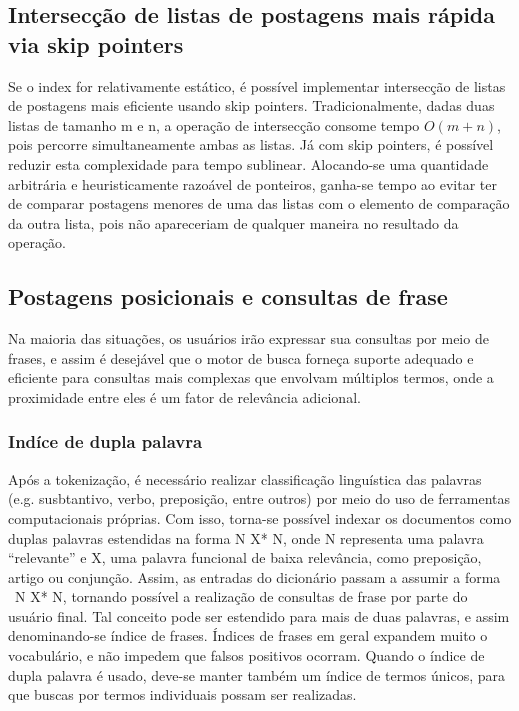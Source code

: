 \subsection{Intersecção de listas de postagens mais rápida via skip pointers}

Se o index for relativamente estático, é possível implementar intersecção de listas de postagens mais eficiente usando skip pointers. Tradicionalmente, dadas duas listas de tamanho m e n, a operação de intersecção consome tempo $O(m+n)$, pois percorre simultaneamente ambas as listas. Já com skip pointers, é possível reduzir esta complexidade para tempo sublinear. Alocando-se uma quantidade arbitrária e heuristicamente razoável de ponteiros, ganha-se tempo ao evitar ter de comparar postagens menores de uma das listas com o elemento de comparação da outra lista, pois não apareceriam de qualquer maneira no resultado da operação.

\subsection{Postagens posicionais e consultas de frase}

Na maioria das situações, os usuários irão expressar sua consultas por meio de frases, e assim é desejável que o motor de busca forneça suporte adequado e eficiente para consultas mais complexas que envolvam múltiplos termos, onde a proximidade entre eles é um fator de relevância adicional.

\subsubsection{Indíce de dupla palavra}

Após a tokenização, é necessário realizar classificação linguística das palavras (e.g. susbtantivo, verbo, preposição, entre outros) por meio do uso de ferramentas computacionais próprias. Com isso, torna-se possível indexar os documentos como duplas palavras estendidas na forma N X* N, onde N representa uma palavra “relevante” e X, uma palavra funcional de baixa relevância, como preposição, artigo ou conjunção. Assim, as entradas do dicionário passam a assumir a forma  N X* N, tornando possível a realização de consultas de frase por parte do usuário final. Tal conceito pode ser estendido para mais de duas palavras, e assim denominando-se índice de frases. Índices de frases em geral expandem muito o vocabulário, e não impedem que falsos positivos ocorram. Quando o índice de dupla palavra é usado, deve-se manter também um índice de termos únicos, para que buscas por termos individuais possam ser realizadas.
 
